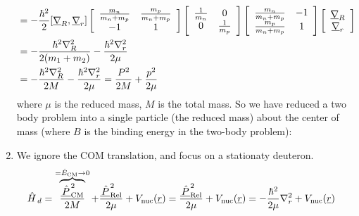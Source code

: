 \documentclass{school-22.101-notes}
\begin{document}
\begin{enumerate}
\begin{align}
 &= - \frac{\hbar^2}{2} [ \underline{\nabla}_R, \underline{\nabla}_r] 
\left[ \begin{array}{cc} \frac{m_n}{m_n+m_p} & \frac{m_p}{m_n+ m_p} \\ -1 & 1 \end{array} \right]
\left[ \begin{array}{cc} \frac{1}{m_n} & 0 \\ 0 & \frac{1}{m_p} \end{array} \right] 
\left[ \begin{array}{cc} \frac{m_n}{m_n+m_p} & -1 \\ \frac{m_p}{m_n+ m_p} & 1 \end{array} \right]
\left[ \begin{array}{c} \underline{\nabla}_R \\ \underline{\nabla}_r \end{array} \right] \\
&= - \frac{\hbar^2 \nabla^2_R}{2 (m_1 + m_2)} - \frac{\hbar^2 \nabla^2_r}{2 \mu} \\
&= - \frac{\hbar^2 \nabla^2_R}{2M} - \frac{\hbar^2 \nabla^2_r}{2 \mu} = \frac{P^2}{2M} + \frac{p^2}{2\mu} 
\end{align}
where $\mu$ is the reduced mass, $M$ is the total mass. So we have reduced a two body problem into  a single particle (the reduced mass) about the center of mass (where $B$ is the binding energy in the two-body problem): 

\item We ignore the COM translation, and focus on a stationaty deuteron. 
\begin{align}
\left. \hat{H} \right._d &= \overbrace{\frac{\underline{\left. \hat{P} \right.}_{\mathrm{CM}}^2}{2M}}^{ = \hat{E}_{\mathrm{CM}} \to  0} + \frac{\underline{\left. \hat{P} \right.}_{\mathrm{Rel}}^2}{2\mu} + V_{\mathrm{nuc}} (\underline{r}) = \frac{\underline{\left. \hat{P} \right.}_{\mathrm{Rel}}^2}{2\mu} + V_{\mathrm{nuc}} (\underline{r}) = -\frac{\hbar^2}{2 \mu} \nabla_r^2 + V_{\mathrm{nuc}} (\underline{r}) 
\end{align}


\end{enumerate}
\end{document}
